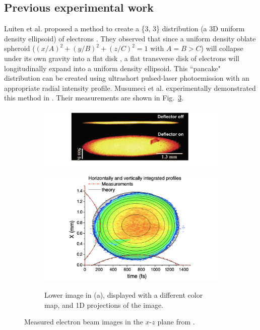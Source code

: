 \subsection{Previous experimental work}

Luiten et al. proposed a method to create a \{3, 3\} distribution (a 3D uniform density ellipsoid) of electrons \cite{Luiten2004}. They observed that since a uniform density oblate spheroid ($(x/A)^2 + (y/B)^2 + (z/C)^2 = 1$ with $A = B > C$) will collapse under its own gravity into a flat disk \cite{Lin1965}, a flat transverse disk of electrons will longitudinally expand into a uniform density ellipsoid. This ``pancake" distribution can be created using ultrashort pulsed-laser photoemission with an appropriate radial intensity profile. Musumeci et al. experimentally demonstrated this method in \cite{Musumeci2008}. Their measurements are shown in Fig.~\ref{fig:Musumeci}.
%
\begin{figure}[!p]
    \centering
    \begin{subfigure}{0.75\textwidth}
        \includegraphics[width=\textwidth]{Images/chapter1/Musumeci_fig2.png}
        \label{fig:Musumeci_a}
        \caption{}
    \end{subfigure}
    \vfill
    \vspace*{1.5cm}
    \vfill
    \begin{subfigure}{0.75\textwidth}
        \centering
        \includegraphics[width=\textwidth]{Images/chapter1/Musumeci_fig3.png}
        \label{fig:Musumeci_b}
        \caption{Lower image in (a), displayed with a different color map, and 1D projections of the image.}
    \end{subfigure}
    \caption{Measured electron beam images in the  $x$-$z$ plane from \cite{Musumeci2008}.}
    \label{fig:Musumeci}
\end{figure}
%


